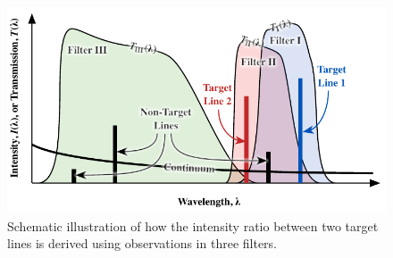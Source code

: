 \documentclass[preprint]{aastex}
\begin{document}
\begin{figure}[t]
  \centering
  \includegraphics{filter-schematic}
  \caption{Schematic illustration of how the intensity ratio between two target lines is derived using observations in three filters. }
  \label{fig:bandpass}
\end{figure}
\end{document}
